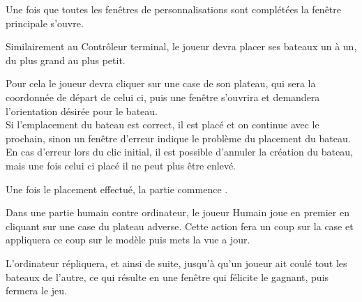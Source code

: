 \par Une fois que toutes les fenêtres de personnalisations sont complétées la fenêtre principale s'ouvre. \\
\par Similairement au Contrôleur terminal, le joueur devra placer ses bateaux un à un, du plus grand au plus petit.
\par Pour cela le joueur devra cliquer sur une case de son plateau, qui sera la coordonnée de départ de celui ci, puis une fenêtre s'ouvrira et demandera l'orientation désirée pour le bateau. \\ Si l'emplacement du bateau est correct, il est placé et on continue avec le prochain, sinon un fenêtre d'erreur indique le problème du placement du bateau. \\ En cas d'erreur lors du clic initial, il est possible d'annuler la création du bateau, mais une fois celui ci placé il ne peut plus être enlevé.
\par Une fois le placement effectué, la partie commence .
\par Dans une partie humain contre ordinateur, le joueur Humain joue en premier en cliquant sur une case du plateau adverse. Cette action fera un coup sur la case et appliquera ce coup sur le modèle puis mets la vue a jour.
\par L'ordinateur répliquera, et ainsi de suite, jusqu'à qu'un joueur ait coulé tout les bateaux de l'autre, ce qui résulte en une fenêtre qui félicite le gagnant, puis fermera le jeu.